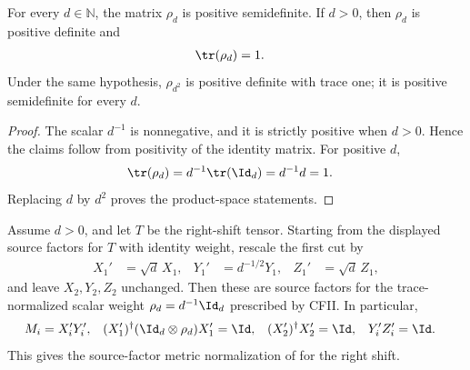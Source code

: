\begin{lemma}
    \label{thm:mpu_shift_trace_weight_normalized}
    \leanok
    For every $d\in\mathbb N$, the matrix $\rho_d$ is positive semidefinite. If
    $d>0$, then $\rho_d$ is positive definite and
    \begin{align}
        \tr(\rho_d) & =1.
    \end{align}
    Under the same hypothesis, $\rho_{d^2}$ is positive definite with trace one;
    it is positive semidefinite for every $d$.
\end{lemma}

\begin{proof}\leanok
    The scalar $d^{-1}$ is nonnegative, and it is strictly positive when
    $d>0$. Hence the claims follow from positivity of the identity matrix.
    For positive $d$,
    \begin{align}
        \tr(\rho_d) & =d^{-1}\tr(\Id_d)=d^{-1}d=1.
    \end{align}
    Replacing $d$ by $d^2$ proves the product-space statements.
\end{proof}

\begin{definition}
    \label{def:mpu_right_shift_paper_source_factors}
    \leanok
    Assume $d>0$, and let $T$ be the right-shift tensor. Starting from the
    displayed source factors for $T$ with identity weight, rescale the first
    cut by
    \begin{align}
        X_1' & =\sqrt d\,X_1,
             & Y_1'           & =d^{-1/2}Y_1,
             & Z_1'           & =\sqrt d\,Z_1,
    \end{align}
    and leave $X_2,Y_2,Z_2$ unchanged. Then these are source factors
    for the trace-normalized scalar weight $\rho_d=d^{-1}\Id_d$ prescribed by
    CFII. In particular,
    \begin{align}
        M_i & =X_i'Y_i',
            & (X_1')^\dagger(\Id_d\otimes\rho_d)X_1' & =\Id,
            & (X_2')^\dagger X_2'                    & =\Id,
            & Y_i'Z_i'                               & =\Id.
    \end{align}
    This gives the source-factor metric normalization of
    \cite[equations~\texttt{Erightleft}, \texttt{X1X2b}, and
        \texttt{YZ=1}]{Cirac2017MPU} for the right shift.
\end{definition}

